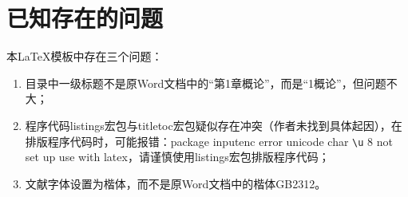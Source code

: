 \newpage\vspace*{-21.6pt}
\section{已知存在的问题}
本\LaTeX 模板中存在三个问题：

\begin{enumerate}[itemsep=0pt,parsep=0pt,label=\arabic*.]
  \item 目录中一级标题不是原Word文档中的“第1章\quad 概论”，而是“1\quad 概论”，但问题不大；
  \item 程序代码listings宏包与titletoc宏包疑似存在冲突（作者未找到具体起因），在排版程序代码时，可能报错：package inputenc error unicode char \verb"\u" 8 not set up use with latex，请谨慎使用listings宏包排版程序代码；
  \item 文献字体设置为楷体，而不是原Word文档中的楷体GB2312。
\end{enumerate}

